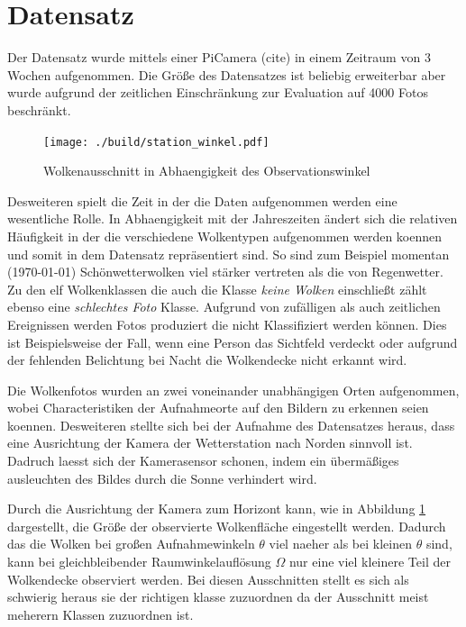 \section{Datensatz}
\label{sec:02_Datensatz}

Der Datensatz wurde mittels einer PiCamera (cite) in einem Zeitraum von 3 Wochen
aufgenommen. 
Die Größe des Datensatzes ist beliebig erweiterbar aber wurde aufgrund der
zeitlichen Einschränkung zur Evaluation auf \num{4000} Fotos beschränkt. 

\begin{figure}
		\centering
		\vspace{-0.5cm}
		\texttt{[image: ./build/station\_winkel.pdf]}
		\caption{Wolkenausschnitt in Abhaengigkeit des Observationswinkel}
		\label{fig:theta}
		\vspace{-0.5cm}
\end{figure}
Desweiteren spielt die Zeit in der die Daten aufgenommen werden eine 
wesentliche Rolle.
In Abhaengigkeit mit der Jahreszeiten ändert sich die relativen Häufigkeit in 
der die verschiedene Wolkentypen aufgenommen werden koennen und somit in dem 
Datensatz repräsentiert sind. 
So sind zum Beispiel momentan (\today) Schönwetterwolken viel stärker vertreten
als die von Regenwetter. 
Zu den elf Wolkenklassen die auch die Klasse \textit{keine Wolken} einschließt 
zählt ebenso eine \textit{schlechtes Foto} Klasse. 
Aufgrund von zufälligen als auch zeitlichen Ereignissen werden Fotos produziert
die nicht Klassifiziert werden können.
Dies ist Beispielsweise der Fall, wenn eine Person das Sichtfeld verdeckt oder 
aufgrund der fehlenden Belichtung bei Nacht die Wolkendecke nicht erkannt wird.

Die Wolkenfotos wurden an zwei voneinander unabhängigen Orten aufgenommen, wobei
Characteristiken der Aufnahmeorte auf den Bildern zu erkennen seien koennen.
Desweiteren stellte sich bei der Aufnahme des Datensatzes heraus, dass eine
Ausrichtung der Kamera der Wetterstation nach Norden sinnvoll ist.
Dadruch laesst sich der Kamerasensor schonen, indem ein übermäßiges ausleuchten
 des Bildes durch die Sonne verhindert wird.

Durch die Ausrichtung der Kamera zum Horizont kann, wie in Abbildung
 \ref{fig:theta} dargestellt, die Größe der observierte Wolkenfläche 
eingestellt werden.
Dadurch das die Wolken bei großen Aufnahmewinkeln $\theta$ viel naeher als bei
kleinen $\theta$ sind, kann bei gleichbleibender Raumwinkelauflösung $\Omega$
nur eine viel kleinere Teil der Wolkendecke observiert werden.
Bei diesen Ausschnitten stellt es sich als schwierig heraus sie der richtigen
klasse zuzuordnen da der Ausschnitt meist meherern Klassen zuzuordnen ist. 

